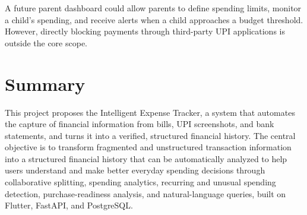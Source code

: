 \documentclass[11pt,a4paper]{article}
\begin{document}
A future parent dashboard could allow parents to define spending limits,
monitor a child's spending, and receive alerts when a child approaches a
budget threshold. However, directly blocking payments through
third-party UPI applications is outside the core scope.


\section{Summary}

This project proposes the Intelligent Expense Tracker, a system that
automates the capture of financial information from bills, UPI
screenshots, and bank statements, and turns it into a verified,
structured financial history. The central objective is to transform
fragmented and unstructured transaction information into a structured
financial history that can be automatically analyzed to help users
understand and make better everyday spending decisions through
collaborative splitting, spending analytics, recurring and unusual
spending detection, purchase-readiness analysis, and natural-language
queries, built on Flutter, FastAPI, and PostgreSQL.
\end{document}
